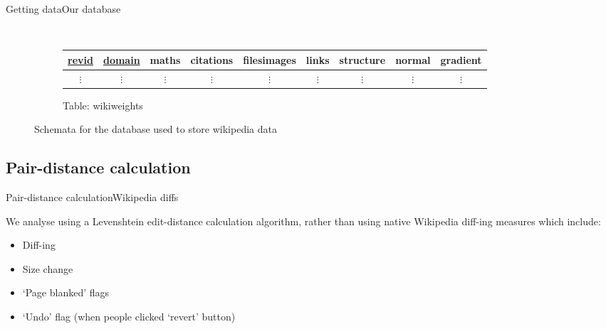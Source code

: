 \documentclass[t]{beamer}
\begin{document}
\begin{frame}[fragile]{Getting data}{Our database}
\begin{figure}[b]
\begin{subfigure}[b!]{\linewidth}
 \end{subfigure}\\
 \vspace{2mm}
 \begin{subfigure}[b!]{\linewidth}
   \centering
   \begin{tabular}{ccccccccc}
     \toprule
     \underline{revid} & \underline{domain} & maths & citations & filesimages & links &
     structure & normal & gradient\\
     \midrule
     $\vdots$ & $\vdots$ & $\vdots$ & $\vdots$ & $\vdots$ & $\vdots$ &
     $\vdots$ & $\vdots$ & $\vdots$ \\
   \end{tabular}
   \caption{\tiny Table: wikiweights} 
 \end{subfigure}
 \caption{Schemata for the database used to store wikipedia data}
\end{figure}  
\end{frame}

  \subsection{Pair-distance calculation}
  \begin{frame}{Pair-distance calculation}{Wikipedia diffs} 

    We analyse using a Levenshtein edit-distance calculation
    algorithm, rather than using native Wikipedia diff-ing measures
    which include: 
    \begin{itemize}
      \item Diff-ing
      \item Size change
      \item `Page blanked' flags
      \item `Undo' flag (when people clicked `revert' button)
    \end{itemize}

    
  \end{frame}
\end{document}
